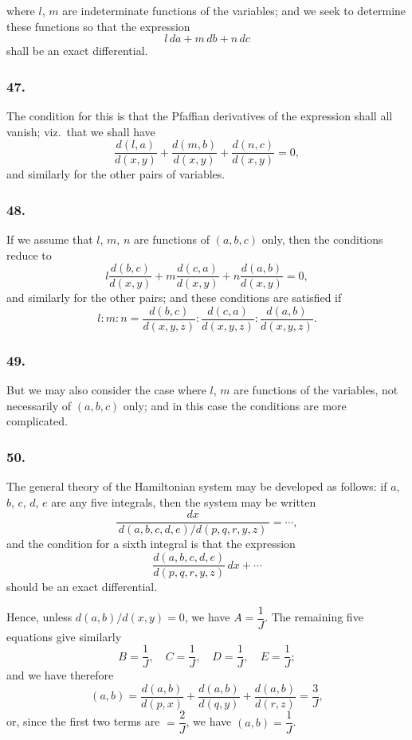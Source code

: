 \documentclass[11pt,a4paper]{book}
\begin{document}
where $l$, $m$ are indeterminate functions of the variables; and we seek to determine these functions so that the expression
\[
l\,da + m\,db + n\,dc
\]
shall be an exact differential.

\subsubsection*{47.}

The condition for this is that the Pfaffian derivatives of the expression shall all vanish; viz.~that we shall have
\[
\frac{d(l, a)}{d(x, y)} + \frac{d(m, b)}{d(x, y)} + \frac{d(n, c)}{d(x, y)} = 0,
\]
and similarly for the other pairs of variables.

\subsubsection*{48.}

If we assume that $l$, $m$, $n$ are functions of $(a, b, c)$ only, then the conditions reduce to
\[
l\frac{d(b, c)}{d(x, y)} + m\frac{d(c, a)}{d(x, y)} + n\frac{d(a, b)}{d(x, y)} = 0,
\]
and similarly for the other pairs; and these conditions are satisfied if
\[
l : m : n = \frac{d(b, c)}{d(x, y, z)} : \frac{d(c, a)}{d(x, y, z)} : \frac{d(a, b)}{d(x, y, z)}.
\]

\newpage
\setcounter{page}{132}

\subsubsection*{49.}

But we may also consider the case where $l$, $m$ are functions of the variables, not necessarily of $(a, b, c)$ only; and in this case the conditions are more complicated.

\subsubsection*{50.}

The general theory of the Hamiltonian system may be developed as follows: if $a$, $b$, $c$, $d$, $e$ are any five integrals, then the system may be written
\[
\frac{dx}{\,d(a, b, c, d, e)/d(p, q, r, y, z)\,} = \cdots,
\]
and the condition for a sixth integral is that the expression
\[
\frac{d(a, b, c, d, e)}{d(p, q, r, y, z)}\,dx + \cdots
\]
should be an exact differential.

\newpage
\setcounter{page}{133}

Hence, unless $d(a, b)/d(x, y) = 0$, we have $A = \dfrac{1}{J}$. The remaining five equations give similarly
\[
B = \frac{1}{J}, \quad C = \frac{1}{J}, \quad D = \frac{1}{J}, \quad E = \frac{1}{J};
\]
and we have therefore
\[
(a, b) = \frac{d(a, b)}{d(p, x)} + \frac{d(a, b)}{d(q, y)} + \frac{d(a, b)}{d(r, z)} = \frac{3}{J},
\]
or, since the first two terms are $= \dfrac{2}{J}$, we have $(a, b) = \dfrac{1}{J}$.
\end{document}
